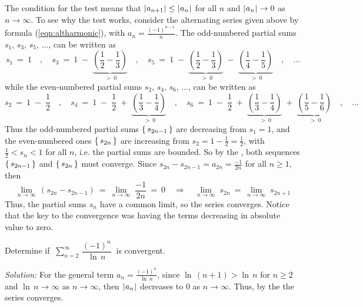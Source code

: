 \noindent The condition for the test means that $\lvert\mspace{1mu}a_{n+1}\mspace{1mu}\rvert \le \lvert\mspace{1mu}a_n\mspace{1mu}\rvert$
for all $n$ and $\lvert\mspace{1mu}a_n\mspace{1mu}\rvert \rightarrow 0$ as $n \rightarrow \infty$. To see why
the test works, consider the alternating series given above by formula
(\ref{eqn:altharmonic}), with $a_n=\frac{(-1)^{n-1}}{n}$. The odd-numbered partial
sums $s_1$, $s_3$, $s_5$, $\ldots$, can be written as
\[
s_1 ~=~ 1 \quad,\quad
s_3 ~=~ 1 \;-\; \underbrace{\left(\frac{1}{2} - \frac{1}{3}\right)}_{~>~ 0} \quad,\quad
s_5 ~=~ 1 \;-\; \underbrace{\left(\frac{1}{2} - \frac{1}{3}\right)}_{~>~ 0} \;-\; 
        \underbrace{\left(\frac{1}{4} - \frac{1}{5}\right)}_{~>~ 0} \quad,\quad\ldots
\]
while the even-numbered partial sums $s_2$, $s_4$, $s_6$, $\ldots$, can be
written as
\[
s_2 ~=~ 1 \;-\; \frac{1}{2} \quad,\quad
s_4 ~=~ 1 \;-\; \frac{1}{2} \;+\; \underbrace{\left(\frac{1}{3} - \frac{1}{4}\right)}_{~>~ 0} \quad,\quad
s_6 ~=~ 1 \;-\; \frac{1}{2} \;+\; \underbrace{\left(\frac{1}{3} - \frac{1}{4}\right)}_{~>~ 0} \;+\; 
        \underbrace{\left(\frac{1}{5} - \frac{1}{6}\right)}_{~>~ 0} \quad,\quad\ldots
\]
Thus the odd-numbered partial sums $\left\lbrace\mspace{3mu}s_{2n-1}\mspace{3mu}\right\rbrace$ are decreasing from $s_1=1$,
and the even-numbered ones $\left\lbrace\mspace{3mu}s_{2n}\mspace{3mu}\right\rbrace$ are increasing from
$s_2=1-\frac{1}{2}=\frac{1}{2}$, with $\frac{1}{2} < s_n < 1$ for all $n$, i.e. the
partial sums are bounded. So by the , both sequences
$\left\lbrace\mspace{3mu}s_{2n-1}\mspace{3mu}\right\rbrace$ and $\left\lbrace\mspace{3mu}s_{2n}\mspace{3mu}\right\rbrace$ must converge. Since
$s_{2n} - s_{2n-1} = a_{2n} = \frac{-1}{2n}$ for all $n \ge 1$, then
\[
\lim_{n \to \infty} \,(s_{2n} - s_{2n-1}) ~=~ \lim_{n \to \infty} \;\frac{-1}{2n} ~=~ 0
\quad\Rightarrow\quad \lim_{n \to \infty} \;s_{2n} ~=~ \lim_{n \to \infty} \;s_{2n+1}
\]
Thus, the partial sums $s_n$ have a common limit, so the series converges.
Notice that the key to the convergence was having the terms decreasing in
absolute value to zero.
\newpage
\begin{exmp}
\noindent Determine if
$~\displaystyle\sum_{n=2}^{\infty} \,\dfrac{(-1)^{n}}{\ln \,n}~$ is
convergent.\vspace{1mm}
\par\noindent\emph{Solution:} For the general term
$a_n = \frac{(-1)^{n}}{\ln \,n}$, since $\ln\,(n+1) > \ln\,n$ for $n\ge 2$ and
$\ln\,n \rightarrow \infty$ as $n \rightarrow \infty$, then $\lvert\mspace{1mu}a_n\mspace{1mu}\rvert$
decreases to 0 as $n \rightarrow \infty$. Thus, by the 
the series converges.
\end{exmp}
\divider
\vspace{2mm}


